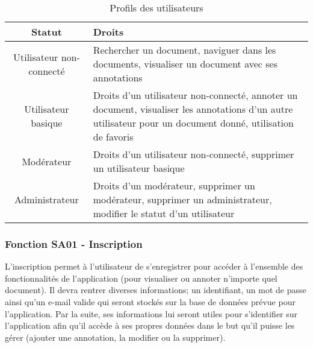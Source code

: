 \documentclass[a4paper]{article}
\begin{document}
\begin{table}[H]
	\centering
		\small
			\begin{tabular}{|c|p{7cm}|}
				\hline
					\rowcolor{lightgray}\textbf{Statut} & \textbf{Droits} \\
				\hline
					Utilisateur non-connecté & Rechercher un document, naviguer dans les documents, visualiser un document avec ses annotations \\
				\hline
					Utilisateur basique & Droits d'un utilisateur non-connecté, annoter un document, visualiser les annotations d'un autre utilisateur pour un document donné, utilisation de favoris \\
				\hline
					Modérateur & Droits d'un utilisateur non-connecté, supprimer un utilisateur basique\\
				\hline
					Administrateur & Droits d'un modérateur, supprimer un modérateur, supprimer un administrateur, modifier le statut d'un utilisateur \\
				\hline
			\end{tabular}
			\caption{Profils des utilisateurs}
		\normalsize
	\label{tab:profils}
\end{table}

\subsubsection{Fonction SA01 - Inscription}

L’inscription permet à l’utilisateur de s’enregistrer pour accéder à l’ensemble des fonctionnalités de l’application (pour visualiser ou annoter n’importe quel document). Il devra rentrer diverses informations; un identifiant, un mot de passe ainsi qu’un e-mail valide qui seront stockés sur la base de données prévue pour l’application. Par la suite, ses informations lui seront utiles pour s’identifier sur l’application afin qu’il accède à ses propres données dans le but qu’il puisse les gérer (ajouter une annotation, la modifier ou la supprimer).
    
\end{document}
